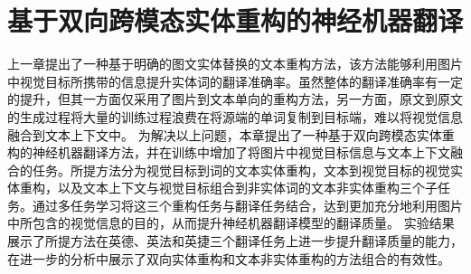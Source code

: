 \chapter{基于双向跨模态实体重构的神经机器翻译}

上一章提出了一种基于明确的图文实体替换的文本重构方法，该方法能够利用图片中视觉目标所携带的信息提升实体词的翻译准确率。虽然整体的翻译准确率有一定的提升，但其一方面仅采用了图片到文本单向的重构方法，另一方面，原文到原文的生成过程将大量的训练过程浪费在将源端的单词复制到目标端，难以将视觉信息融合到文本上下文中。
为解决以上问题，本章提出了一种基于双向跨模态实体重构的神经机器翻译方法，并在训练中增加了将图片中视觉目标信息与文本上下文融合的任务。所提方法分为视觉目标到词的文本实体重构，文本到视觉目标的视觉实体重构，以及文本上下文与视觉目标组合到非实体词的文本非实体重构三个子任务。通过多任务学习将这三个重构任务与翻译任务结合，达到更加充分地利用图片中所包含的视觉信息的目的，从而提升神经机器翻译模型的翻译质量。
实验结果展示了所提方法在英德、英法和英捷三个翻译任务上进一步提升翻译质量的能力，在进一步的分析中展示了双向实体重构和文本非实体重构的方法组合的有效性。








